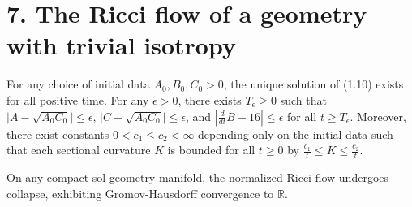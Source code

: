 \section*{7. The Ricci flow of a geometry with trivial isotropy}

\begin{proposition}
\label{ch01-prop-sol}
For any choice of initial data $A_0, B_0, C_0 > 0$, the unique solution of (1.10) exists for all positive time. For any $\epsilon > 0$, there exists $T_\epsilon \ge 0$ such that $\lvert A - \sqrt{A_0C_0} \rvert \le \epsilon$, $\lvert C - \sqrt{A_0C_0} \rvert \le \epsilon$, and $\left\lvert \frac{d}{dt} B - 16 \right\rvert \le \epsilon$ for all $t \ge T_\epsilon$. Moreover, there exist constants $0 < c_1 \le c_2 < \infty$ depending only on the initial data such that each sectional curvature $K$ is bounded for all $t \ge 0$ by $\frac{c_1}{t} \le K \le \frac{c_2}{t}$.
\end{proposition}

\begin{corollary}
\label{ch01-cor-sol-collapse}
On any compact sol-geometry manifold, the normalized Ricci flow undergoes collapse, exhibiting Gromov-Hausdorff convergence to $\mathbb{R}$.
\end{corollary}
